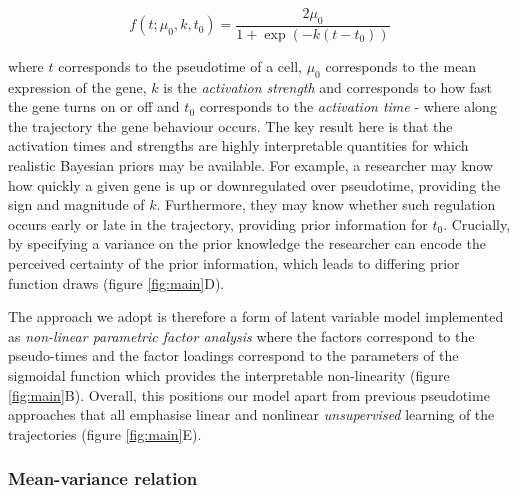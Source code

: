 \begin{equation}
f(t; \mu_0, k, t_0) = \frac{2 \mu_0}{1 + \exp\left( -k (t - t_0) \right)}
\end{equation}

where $t$ corresponds to the pseudotime of a cell, $\mu_0$ corresponds to the mean expression of the gene, $k$ is the \emph{activation strength} and corresponds to how fast the  gene turns on or off and $t_0$ corresponds to the \emph{activation time} - where along the trajectory the gene behaviour occurs. The key result here is that the activation times and strengths are highly interpretable quantities for which realistic Bayesian priors may be available. For example, a researcher may know how quickly a given gene is up or downregulated over pseudotime, providing the sign and magnitude of $k$. Furthermore, they may know whether such regulation occurs early or late in the trajectory, providing prior information for $t_0$. Crucially, by specifying a variance on the prior knowledge the researcher can encode the perceived certainty of the prior information, which leads to differing prior function draws (figure \ref{fig:main}D).


The approach we adopt is therefore a form of latent variable model implemented as \emph{non-linear parametric factor analysis} where the factors correspond to the pseudo-times and the factor loadings correspond to the parameters of the sigmoidal function which provides the interpretable non-linearity (figure \ref{fig:main}B). Overall, this positions our model apart from previous pseudotime approaches that all emphasise linear and nonlinear \emph{unsupervised} learning of the trajectories (figure \ref{fig:main}E).



\subsubsection{Mean-variance relation}
%

